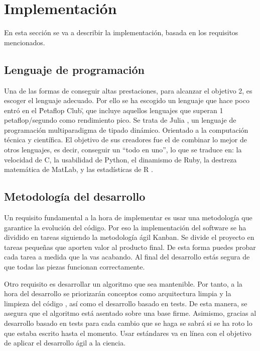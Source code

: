 \chapter{Implementación}
En esta sección se va a describir la implementación, basada en los requisitos mencionados.

\section{Lenguaje de programación}

Una de las formas de conseguir altas prestaciones, para alcanzar el objetivo 2, es escoger el lenguaje adecuado. Por ello se ha escogido
un lenguaje que hace poco entró en el \"Petaflop Club\", que incluye aquellos lenguajes que superan 1 petaflop/segundo como rendimiento pico. Se trata
de Julia \cite{julia}, un lenguaje de programación multiparadigma de tipado dinámico. Orientado a la computación técnica y
científica. El objetivo de sus creadores fue el de combinar lo mejor de otros lenguajes, es decir, conseguir un “todo en uno”, lo que se traduce en:
la velocidad de C, la usabilidad de Python, el dinamismo de Ruby, la destreza matemática de MatLab, y las estadísticas de R \cite{julia_goals}.

\section{Metodología del desarrollo}

Un requisito fundamental a la hora de implementar es usar una metodología que garantice la evolución del código. Por eso la implementación 
del software se ha dividido en tareas siguiendo la metodología ágil Kanban. Se divide el proyecto en tareas pequeñas que aporten valor al producto 
final. De esta forma puedes probar cada tarea a medida que la vas acabando. Al final del desarrollo estás segura de que todas las piezas funcionan
correctamente.

Otro requisito es desarrollar un algoritmo que sea mantenible. Por tanto, a la hora del desarrollo se priorizarán conceptos 
como arquitectura limpia \cite{cleanArquitecture2017} y la limpieza del código \cite{cleanCode2008}, así como el desarrollo basado en tests. De esta manera, se asegura
que el algoritmo está asentado sobre una base firme. Asimismo, gracias al desarrollo basado en tests para cada cambio que se haga
se sabrá si se ha roto lo que estaba escrito hasta el momento.  Usar estándares va en línea con el objetivo de aplicar el desarrollo ágil a la ciencia.

